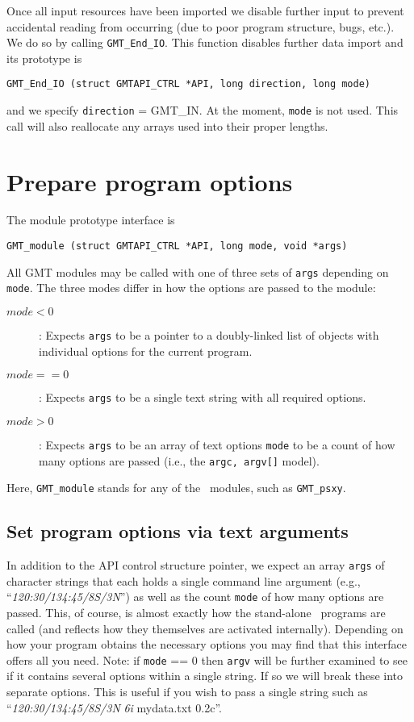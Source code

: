 \documentclass{report}
\begin{document}
Once all input resources have been imported we disable further input to prevent accidental
reading from occurring (due to poor program structure, bugs, etc.).  We do so by calling \texttt{GMT\_End\_IO}.  This
function disables further data import and its prototype is

\begin{verbatim}
GMT_End_IO (struct GMTAPI_CTRL *API, long direction, long mode)
\end{verbatim}

and we specify \texttt{direction} = GMT\_IN.  At the moment, \texttt{mode} is not used.  This call
will also reallocate any arrays used into their proper lengths.

\section{Prepare program options}
\label{sec:func}
The module prototype interface is

\begin{verbatim}
GMT_module (struct GMTAPI_CTRL *API, long mode, void *args)
\end{verbatim}
All GMT modules may be called with one of three sets of \texttt{args} depending on \texttt{mode}.
The three modes differ in how the options are passed to the module:
\begin{description}
\item [$mode < 0$]: Expects \texttt{args} to be a pointer to a doubly-linked list of objects with individual options
for the current program.
\item [$mode == 0$]: Expects \texttt{args} to be a single text string with all required options.
\item [$mode > 0$]: Expects \texttt{args} to be an array of text options \texttt{mode} to be a count of
how many options are passed (i.e., the \texttt{argc, argv[]} model).
\end{description}
Here, \texttt{GMT\_module} stands for any of the \GMT\ modules, such as \texttt{GMT\_psxy}.

\subsection{Set program options via text arguments}

In addition to the API control structure pointer, we expect an array \texttt{args} of character strings that each
holds a single command line argument (e.g., ``\emph{120:30/134:45/8S/3N}'') as well as the count \texttt{mode}
of how many options are passed.  This, of course, is almost exactly how the stand-alone \GMT\
programs are called (and reflects how they themselves are activated internally).  Depending on how
your program obtains the necessary options you may find that this interface offers all you need.
Note: if \texttt{mode} == 0 then \texttt{argv} will be further examined to see if it contains several options within a single string.
If so we will break these into separate options.  This is useful if you wish to pass a single string such as
``\Opt{R}\emph{120:30/134:45/8S/3N} \Opt{JM}\emph{6i} mydata.txt \Opt{Sc}0.2c''.
\end{document}
